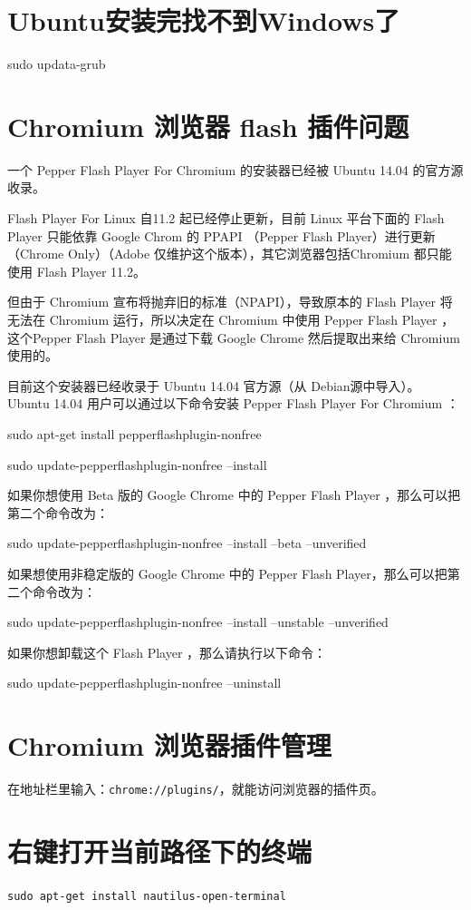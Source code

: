 {\section{Ubuntu安装完找不到Windows了}
sudo updata-grub


\section{Chromium 浏览器 flash 插件问题}
一个 Pepper Flash Player For Chromium 的安装器已经被 Ubuntu 14.04 的官方源收录。

Flash Player For Linux 自11.2 起已经停止更新，目前 Linux 平台下面的 Flash Player 只能依靠 Google Chrom 的 PPAPI （Pepper Flash Player）进行更新（Chrome Only）（Adobe 仅维护这个版本），其它浏览器包括Chromium 都只能使用 Flash Player 11.2。

但由于 Chromium 宣布将抛弃旧的标准（NPAPI），导致原本的 Flash Player 将无法在 Chromium 运行，所以决定在 Chromium 中使用 Pepper Flash Player ，这个Pepper Flash Player 是通过下载 Google Chrome 然后提取出来给 Chromium 使用的。

目前这个安装器已经收录于 Ubuntu 14.04 官方源（从 Debian源中导入）。
Ubuntu 14.04 用户可以通过以下命令安装 Pepper Flash Player For Chromium ：

sudo apt-get install pepperflashplugin-nonfree

sudo update-pepperflashplugin-nonfree --install

如果你想使用 Beta 版的 Google Chrome 中的 Pepper Flash Player ，那么可以把第二个命令改为：

sudo update-pepperflashplugin-nonfree --install --beta --unverified

如果想使用非稳定版的 Google Chrome 中的 Pepper Flash Player，那么可以把第二个命令改为：

sudo update-pepperflashplugin-nonfree --install --unstable --unverified

如果你想卸载这个 Flash Player ，那么请执行以下命令：

sudo update-pepperflashplugin-nonfree --uninstall



\section{Chromium 浏览器插件管理}
在地址栏里输入：\verb|chrome://plugins/|，就能访问浏览器的插件页。


\section{右键打开当前路径下的终端}
\verb|sudo apt-get install nautilus-open-terminal|

}
